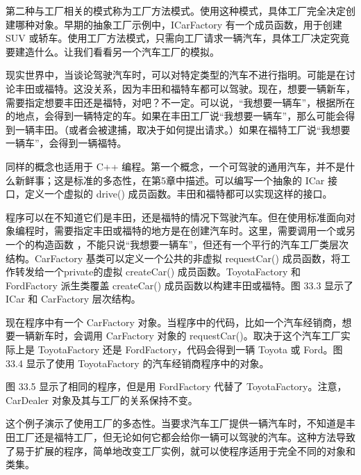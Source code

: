 
第二种与工厂相关的模式称为工厂方法模式。使用这种模式，具体工厂完全决定创建哪种对象。早期的抽象工厂示例中，ICarFactory 有一个成员函数，用于创建 SUV 或轿车。使用工厂方法模式，只需向工厂请求一辆汽车，具体工厂决定究竟要建造什么。让我们看看另一个汽车工厂的模拟。


现实世界中，当谈论驾驶汽车时，可以对特定类型的汽车不进行指明。可能是在讨论丰田或福特。这没关系，因为丰田和福特车都可以驾驶。现在，想要一辆新车，需要指定想要丰田还是福特，对吧？不一定。可以说，“我想要一辆车”，根据所在的地点，会得到一辆特定的车。如果在丰田工厂说“我想要一辆车”，那么可能会得到一辆丰田。（或者会被逮捕，取决于如何提出请求。）如果在福特工厂说“我想要一辆车”，会得到一辆福特。

同样的概念也适用于 C++ 编程。第一个概念，一个可驾驶的通用汽车，并不是什么新鲜事；这是标准的多态性，在第5章中描述。可以编写一个抽象的 ICar 接口，定义一个虚拟的 drive() 成员函数。丰田和福特都可以实现这样的接口。

程序可以在不知道它们是丰田，还是福特的情况下驾驶汽车。但在使用标准面向对象编程时，需要指定丰田或福特的地方是在创建汽车时。这里，需要调用一个或另一个的构造函数 ，不能只说“我想要一辆车”，但还有一个平行的汽车工厂类层次结构。CarFactory 基类可以定义一个公共的非虚拟 requestCar() 成员函数，将工作转发给一个private的虚拟 createCar() 成员函数。ToyotaFactory 和 FordFactory 派生类覆盖 createCar() 成员函数以构建丰田或福特。图 33.3 显示了 ICar 和 CarFactory 层次结构。


现在程序中有一个 CarFactory 对象。当程序中的代码，比如一个汽车经销商，想要一辆新车时，会调用 CarFactory 对象的 requestCar()。取决于这个汽车工厂实际上是 ToyotaFactory 还是 FordFactory，代码会得到一辆 Toyota 或 Ford。图 33.4 显示了使用 ToyotaFactory 的汽车经销商程序中的对象。


图 33.5 显示了相同的程序，但是用 FordFactory 代替了 ToyotaFactory。注意，CarDealer 对象及其与工厂的关系保持不变。


这个例子演示了使用工厂的多态性。当要求汽车工厂提供一辆汽车时，不知道是丰田工厂还是福特工厂，但无论如何它都会给你一辆可以驾驶的汽车。这种方法导致了易于扩展的程序，简单地改变工厂实例，就可以使程序适用于完全不同的对象和类集。

